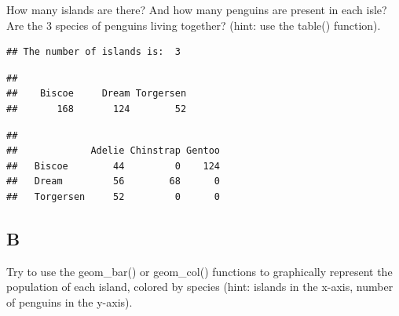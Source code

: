 \documentclass[
]{article}
\newenvironment{Shaded}{\begin{snugshade}}{\end{snugshade}}
\newcommand{\FunctionTok}[1]{\textcolor[rgb]{0.13,0.29,0.53}{\textbf{#1}}}
\newcommand{\NormalTok}[1]{#1}
\newcommand{\SpecialCharTok}[1]{\textcolor[rgb]{0.81,0.36,0.00}{\textbf{#1}}}
\newcommand{\StringTok}[1]{\textcolor[rgb]{0.31,0.60,0.02}{#1}}
\begin{document}
How many islands are there? And how many penguins are present in each
isle? Are the 3 species of penguins living together? (hint: use the
table() function).

\begin{Shaded}
\end{Shaded}

\begin{verbatim}
## The number of islands is:  3
\end{verbatim}

\begin{Shaded}
\end{Shaded}

\begin{verbatim}
## 
##    Biscoe     Dream Torgersen 
##       168       124        52
\end{verbatim}

\begin{Shaded}
\end{Shaded}

\begin{verbatim}
##            
##             Adelie Chinstrap Gentoo
##   Biscoe        44         0    124
##   Dream         56        68      0
##   Torgersen     52         0      0
\end{verbatim}

\hypertarget{b-4}{%
\subsection{B}\label{b-4}}

Try to use the geom\_bar() or geom\_col() functions to graphically
represent the population of each island, colored by species (hint:
islands in the x-axis, number of penguins in the y-axis).
\end{document}
